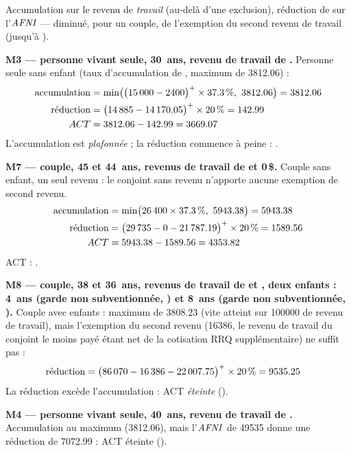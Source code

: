 \pexemples Accumulation sur le revenu de \emph{travail} (au-delà d'une exclusion),
réduction de  sur l'$\mathit{AFNI}$ — diminué, pour un couple,
de l'exemption du second revenu de travail (jusqu'à
).

\medskip\noindent\textbf{M3 --- personne vivant seule, 30~ans, revenu de travail de .}
Personne seule sans enfant (taux d'accumulation de
, maximum de \num{3812.06}) :
\begin{align*}
\text{accumulation} &= \min\bigl(\bigl(\num{15000} - \num{2400}\bigr)^{+} \times \num{37.3}\,\%,\ \num{3812.06}\bigr) = \num{3812.06} \\
\text{réduction} &= \bigl(\num{14885} - \num{14170.05}\bigr)^{+} \times \num{20}\,\% = \num{142.99} \\
ACT &= \num{3812.06} - \num{142.99} = \num{3669.07}
\end{align*}
L'accumulation est \emph{plafonnée} ; la réduction commence à peine :
.

\medskip\noindent\textbf{M7 --- couple, 45 et 44~ans, revenus de travail de  et 0\,\$.}
Couple sans enfant, un seul revenu : le conjoint sans revenu n'apporte
aucune exemption de second revenu.
\begin{align*}
\text{accumulation} &= \min\bigl(\num{26400} \times \pc{37.3},\ \num{5943.38}\bigr) = \num{5943.38} \\
\text{réduction} &= \pos{\num{29735} - 0 - \num{21787.19}} \times \pc{20} = \num{1589.56} \\
ACT &= \num{5943.38} - \num{1589.56} = \num{4353.82}
\end{align*}
ACT : .

\medskip\noindent\textbf{M8 --- couple, 38 et 36~ans, revenus de travail de  et , deux enfants : 4~ans (garde non subventionnée, ) et 8~ans (garde non subventionnée, ).}
Couple avec enfants : maximum de \num{3808.23} (vite atteint sur
\num{100000} de revenu de travail), mais l'exemption du second revenu
(\num{16386}, le revenu de travail du conjoint le moins payé étant net
de la cotisation RRQ supplémentaire) ne suffit pas :
\begin{align*}
\text{réduction} &= \bigl(\num{86070} - \num{16386} - \num{22007.75}\bigr)^{+} \times \num{20}\,\% = \num{9535.25}
\end{align*}
La réduction excède l'accumulation : ACT \emph{éteinte} ().

\medskip\noindent\textbf{M4 --- personne vivant seule, 40~ans, revenu de travail de .}
Accumulation au maximum (\num{3812.06}), mais l'$\mathit{AFNI}$ de
\num{49535} donne une réduction de \num{7072.99} : ACT éteinte
().
